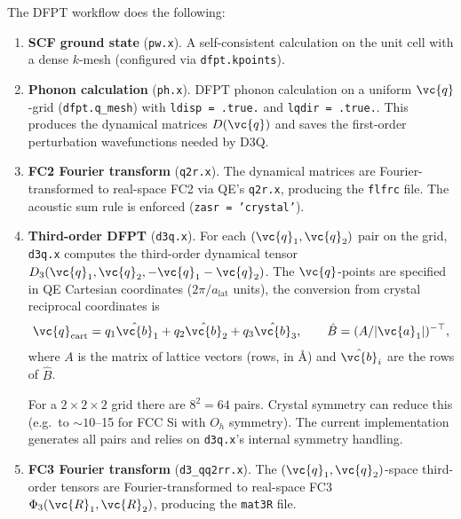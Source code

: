 The DFPT workflow does the following:
\begin{enumerate}
  \item \textbf{SCF ground state} (\texttt{pw.x}).
        A self-consistent calculation on the unit cell with a dense
        $k$-mesh (configured via \texttt{dfpt.kpoints}).

  \item \textbf{Phonon calculation} (\texttt{ph.x}).
        DFPT phonon calculation on a uniform $\vc{q}$-grid
        (\texttt{dfpt.q\_mesh}) with
        \texttt{ldisp\,=\,.true.} and \texttt{lqdir\,=\,.true.}.  This
        produces the dynamical matrices $D(\vc{q})$ and saves the
        first-order perturbation wavefunctions needed by D3Q.

  \item \textbf{FC2 Fourier transform} (\texttt{q2r.x}).
        The dynamical matrices are Fourier-transformed to real-space FC2
        via QE's \texttt{q2r.x}, producing the \texttt{flfrc} file.
        The acoustic sum rule is enforced
        (\texttt{zasr\,=\,'crystal'}).

  \item \textbf{Third-order DFPT} (\texttt{d3q.x}).
        For each $(\vc{q}_1,\vc{q}_2)$ pair on the grid, \texttt{d3q.x}
        computes the third-order dynamical tensor
        $D_3(\vc{q}_1,\vc{q}_2,-\vc{q}_1-\vc{q}_2)$.  The
        $\vc{q}$-points are specified in QE Cartesian coordinates
        ($2\pi/a_\text{lat}$ units), the conversion from crystal
        reciprocal coordinates is
        \begin{equation}\label{eq:q_conversion}
          \vc{q}_\text{cart}
          = q_1 \hat{\vc{b}}_1 + q_2 \hat{\vc{b}}_2 + q_3 \hat{\vc{b}}_3,
          \qquad
          \hat{B} = (A / |\vc{a}_1|)^{-\top},
        \end{equation}
        where $A$ is the matrix of lattice vectors (rows, in \AA) and
        $\hat{\vc{b}}_i$ are the rows of $\hat{B}$.

        For a $2\times2\times2$ grid there are $8^2 = 64$ pairs.
        Crystal symmetry can reduce this (e.g.\ to ${\sim}10$--15 for
        FCC Si with $O_h$ symmetry). The current implementation
        generates all pairs and relies on \texttt{d3q.x}'s internal
        symmetry handling.

  \item \textbf{FC3 Fourier transform} (\texttt{d3\_qq2rr.x}).
        The $(\vc{q}_1,\vc{q}_2)$-space third-order tensors are
        Fourier-transformed to real-space FC3
        $\Phi_3(\vc{R}_1,\vc{R}_2)$, producing the \texttt{mat3R} file.


\end{enumerate}
